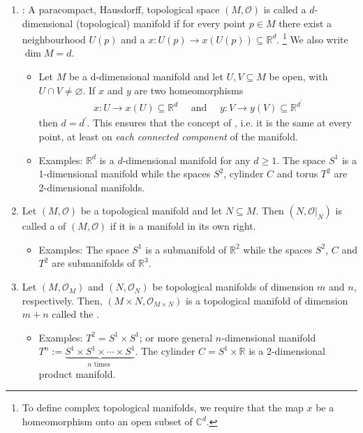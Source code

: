 \documentclass{article}
\begin{document}
\begin{enumerate}
    \item {}: A paracompact, Hausdorff, topological space $(M, \mathcal{O})$ is called a $d$-dimensional (topological) manifold if for every point $p \in M$ there exist a neighbourhood $U(p)$ and a  $x: U(p) \rightarrow x(U(p)) \subseteq \mathbb{R}^{d}$. \footnote{To define complex topological manifolds, we require that the map $x$ be a homeomorphism onto an open subset of $\mathbb{C}^{d}$.} We also write $\operatorname{dim} M=d$.
\begin{itemize}
    \item  Let $M$ be a d-dimensional manifold and let $U, V \subseteq M$ be open, with $U \cap V \neq \varnothing$. If $x$ and $y$ are two homeomorphisms
\begin{align*}
x: U \rightarrow x(U) \subseteq \mathbb{R}^{d} \quad \text { and } \quad y: V \rightarrow y(V) \subseteq \mathbb{R}^{d^{\prime}}
\end{align*}
then $d=d^{\prime}$.
This ensures that the concept of , i.e. it is the same at every point, at least on \emph{each connected component} of the manifold.
\item Examples: $\mathbb{R}^{d}$ is a $d$-dimensional manifold for any $d \geq 1$. The space $S^{1}$ is a 1-dimensional manifold while the spaces $S^{2}$, cylinder $C$ and torus $T^{2}$ are 2-dimensional manifolds.
\end{itemize}
\item {} Let $(M, \mathcal{O})$ be a topological manifold and let $N \subseteq M$. Then $\left(N,\left.\mathcal{O}\right|_{N}\right)$ is called a  of $(M, \mathcal{O})$ if it is a manifold in its own right.
\begin{itemize}
    \item Examples: The space $S^{1}$ is a submanifold of $\mathbb{R}^{2}$ while the spaces $S^{2}$, $C$ and $T^{2}$ are submanifolds of $\mathbb{R}^{3}$.
\end{itemize}
\item {} Let $\left(M, \mathcal{O}_{M}\right)$ and $\left(N, \mathcal{O}_{N}\right)$ be topological manifolds of dimension $m$ and $n$, respectively. Then, $\left(M \times N, \mathcal{O}_{M \times N}\right)$ is a topological manifold of dimension $m+n$ called the .
\begin{itemize}
    \item Examples: $T^{2}=S^{1} \times S^{1}$; or more general $n$-dimensional manifold $T^{n}:=\underbrace{S^{1} \times S^{1} \times \cdots \times S^{1}}_{n \text { times }}$. The cylinder $C=S^{1} \times \mathbb{R}$ is a 2-dimensional product manifold.

\end{itemize}
\end{enumerate}
\end{document}
